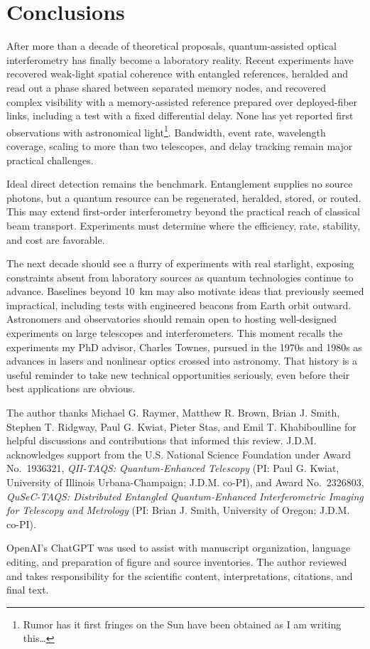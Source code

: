 \documentclass[]{spie}
\begin{document}
\section{Conclusions}
\label{sec:conclusions}

After more than a decade of theoretical proposals, quantum-assisted optical interferometry has finally become a laboratory reality. Recent experiments have recovered weak-light spatial coherence with entangled references, heralded and read out a phase shared between separated memory nodes, and recovered complex visibility with a memory-assisted reference prepared over deployed-fiber links, including a test with a fixed differential delay. None has yet reported first observations with astronomical light\footnote{Rumor has it first fringes on the Sun have been obtained as I am writing this\ldots}. Bandwidth, event rate, wavelength coverage, scaling to more than two telescopes, and delay tracking remain major practical challenges.

Ideal direct detection remains the benchmark. Entanglement supplies no source photons, but a quantum resource can be regenerated, heralded, stored, or routed. This may extend first-order interferometry beyond the practical reach of classical beam transport. Experiments must determine where the efficiency, rate, stability, and cost are favorable.

The next decade should see a flurry of experiments with real starlight, exposing constraints absent from laboratory sources as quantum technologies continue to advance. Baselines beyond 10~km may also motivate ideas that previously seemed impractical, including tests with engineered beacons from Earth orbit outward. Astronomers and observatories should remain open to hosting well-designed experiments on large telescopes and interferometers. This moment recalls the experiments my PhD advisor, Charles Townes, pursued in the 1970s and 1980s as advances in lasers and nonlinear optics crossed into astronomy. That history is a useful reminder to take new technical opportunities seriously, even before their best applications are obvious.

\begin{acknowledgments}
The author thanks Michael G. Raymer, Matthew R. Brown, Brian J. Smith, Stephen T. Ridgway, Paul G. Kwiat, Pieter Stas, and Emil T. Khabiboulline for helpful discussions and contributions that informed this review. J.D.M. acknowledges support from the U.S. National Science Foundation under Award No.~1936321, \textit{QII-TAQS: Quantum-Enhanced Telescopy} (PI: Paul G. Kwiat, University of Illinois Urbana-Champaign; J.D.M. co-PI), and Award No.~2326803, \textit{QuSeC-TAQS: Distributed Entangled Quantum-Enhanced Interferometric Imaging for Telescopy and Metrology} (PI: Brian J. Smith, University of Oregon; J.D.M. co-PI).

OpenAI's ChatGPT was used to assist with manuscript organization, language editing, and preparation of figure and source inventories. The author reviewed and takes responsibility for the scientific content, interpretations, citations, and final text.
\end{acknowledgments}

{\footnotesize
\setlength{\baselineskip}{8.5pt}


}
\end{document}
